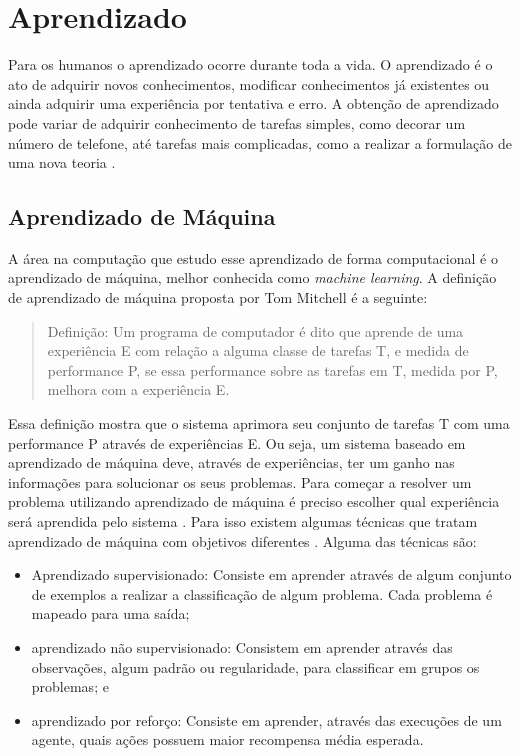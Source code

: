 \chapter{\label{chap:aprendizado}Aprendizado}
 
Para os humanos o aprendizado ocorre durante toda a vida. 
O aprendizado é o ato de adquirir novos conhecimentos, modificar conhecimentos já existentes ou ainda adquirir uma experiência por tentativa e erro. A obtenção de aprendizado pode variar de adquirir conhecimento de tarefas simples, como decorar um número de telefone, até tarefas mais complicadas, como a realizar a formulação de uma nova teoria \cite{intelligence2003modern}. 

\section{Aprendizado de Máquina} 

A área na computação que estudo esse aprendizado de forma computacional é o aprendizado de máquina, melhor conhecida como \textit{machine learning}. 
A definição de aprendizado de máquina proposta por Tom Mitchell \cite{Mitchell1997ML} é a seguinte:

\begin{quote}
	Definição: Um programa de computador é dito que aprende de uma experiência E com relação a alguma classe de tarefas T, e medida de performance P, se essa performance sobre as tarefas em T, medida por P, melhora com a experiência E.
\end{quote}

Essa definição mostra que o sistema aprimora seu conjunto de tarefas T com uma performance P através de experiências E. 
Ou seja, um sistema baseado em aprendizado de máquina deve, através de experiências, ter um ganho nas informações para solucionar os seus problemas. 
Para começar a resolver um problema utilizando aprendizado de máquina é preciso escolher qual experiência será aprendida pelo sistema \cite{Mitchell1997ML}. 
Para isso existem algumas técnicas que tratam aprendizado de máquina com objetivos diferentes \cite{intelligence2003modern}. 
Alguma das técnicas são: 
\begin{itemize}
	\item Aprendizado supervisionado: Consiste em aprender através de algum conjunto de exemplos a realizar a classificação de algum problema. Cada problema é mapeado para uma saída;  
	\item aprendizado não supervisionado: Consistem em aprender através das observações, algum padrão ou regularidade, para classificar em grupos os problemas; e 
	\item aprendizado por reforço: Consiste em aprender, através das execuções de um agente, quais ações possuem maior recompensa média esperada.
\end{itemize}

